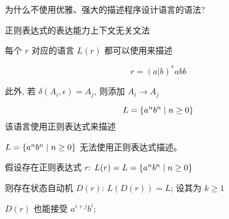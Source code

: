 
\begin{frame}{}
  \begin{center}
    为什么不使用优雅、强大的描述程序设计语言的语法?

    \vspace{0.50cm}
    正则表达式的表达能力上下文无关文法
  \end{center}
\end{frame}

\begin{frame}{}
  \begin{center}
    每个 $r$ 对应的语言 $L(r)$ 都可以使用来描述

    \[
      r = (a | b)^{\ast} abb
    \]

    \pause

    \pause
    此外, 若 $\delta(A_i, \epsilon) = A_{j}$, 则添加 $A_{i} \to A_{j}$
  \end{center}
\end{frame}

\begin{frame}{}
  \begin{center}
    

    \[
      L = \{a^{n} b^{n} \mid n \ge 0\}
    \]
    该语言使用正则表达式来描述
  \end{center}
\end{frame}

\begin{frame}{}
  \begin{theorem}
    $L = \{a^{n} b^{n} \mid n \ge 0\}$ 无法使用正则表达式描述。
  \end{theorem}

  \pause
  \begin{center}

    \pause
    \vspace{0.30cm}
    假设存在正则表达式 $r$: $L(r) = L = \{a^{n} b^{n} \mid n \ge 0\}$

    \pause
    \vspace{0.30cm}
    则存在状态自动机 $D(r)$: $L(D(r)) = L$; 设其为 $k \ge 1$

    \pause
    \vspace{0.30cm}

    \pause
    \vspace{0.30cm}
    $D(r)$ 也能接受 $a^{i+j} b^{i}$; 
  \end{center}
\end{frame}

